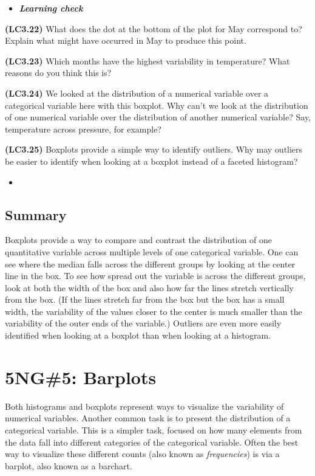 \documentclass[12pt,]{krantz}
\newenvironment{rmdblock}[1]
  {\begin{shaded*}
  \begin{itemize}
  \renewcommand{\labelitemi}{
    \raisebox{-.7\height}[0pt][0pt]{
    }
  }
  \item
  }
  {
  \end{itemize}
  \end{shaded*}
  }
\newenvironment{learncheck}
  {\begin{rmdblock}{warning}}
  {\end{rmdblock}}
\theoremstyle{definition}
\theoremstyle{definition}
\theoremstyle{definition}
\theoremstyle{remark}
\begin{document}
\begin{learncheck}
\textbf{\emph{Learning check}}
\end{learncheck}

\textbf{(LC3.22)} What does the dot at the bottom of the plot for May
correspond to? Explain what might have occurred in May to produce this
point.

\textbf{(LC3.23)} Which months have the highest variability in
temperature? What reasons do you think this is?

\textbf{(LC3.24)} We looked at the distribution of a numerical variable
over a categorical variable here with this boxplot. Why can't we look at
the distribution of one numerical variable over the distribution of
another numerical variable? Say, temperature across pressure, for
example?

\textbf{(LC3.25)} Boxplots provide a simple way to identify outliers.
Why may outliers be easier to identify when looking at a boxplot instead
of a faceted histogram?

\begin{learncheck}

\end{learncheck}

\subsection{Summary}\label{summary-3}

Boxplots provide a way to compare and contrast the distribution of one
quantitative variable across multiple levels of one categorical
variable. One can see where the median falls across the different groups
by looking at the center line in the box. To see how spread out the
variable is across the different groups, look at both the width of the
box and also how far the lines stretch vertically from the box. (If the
lines stretch far from the box but the box has a small width, the
variability of the values closer to the center is much smaller than the
variability of the outer ends of the variable.) Outliers are even more
easily identified when looking at a boxplot than when looking at a
histogram.

\section{5NG\#5: Barplots}\label{geombar}

Both histograms and boxplots represent ways to visualize the variability
of numerical variables. Another common task is to present the
distribution of a categorical variable. This is a simpler task, focused
on how many elements from the data fall into different categories of the
categorical variable. Often the best way to visualize these different
counts (also known as \emph{frequencies}) is via a barplot, also known
as a barchart.
\end{document}
